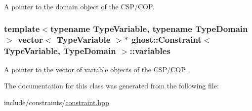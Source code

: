 A pointer to the domain object of the C\-S\-P/\-C\-O\-P. 

\hypertarget{classghost_1_1Constraint_a827e487bd77c8dbc4701d1dfae39678a}{
\subsubsection[{variables}]{\setlength{\rightskip}{0pt plus 5cm}template$<$typename Type\-Variable, typename Type\-Domain$>$ vector$<$ Type\-Variable $>$$\ast$ {\bf ghost\-::\-Constraint}$<$ Type\-Variable, Type\-Domain $>$\-::variables\hspace{0.3cm}{\ttfamily [protected]}}}\label{classghost_1_1Constraint_a827e487bd77c8dbc4701d1dfae39678a}


A pointer to the vector of variable objects of the C\-S\-P/\-C\-O\-P. 



The documentation for this class was generated from the following file\-:\begin{DoxyCompactItemize}
\item 
include/constraints/\hyperlink{constraint_8hpp}{constraint.\-hpp}\end{DoxyCompactItemize}
